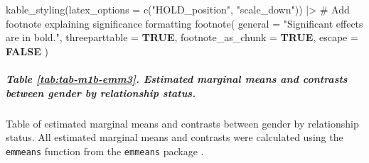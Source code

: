 \documentclass[
  bookmarksnumbered]{article}
\newenvironment{Shaded}{\begin{snugshade}}{\end{snugshade}}
\newcommand{\AttributeTok}[1]{\textcolor[rgb]{0.80,0.80,0.80}{#1}}
\newcommand{\CommentTok}[1]{\textcolor[rgb]{0.50,0.62,0.50}{#1}}
\newcommand{\ConstantTok}[1]{\textcolor[rgb]{0.86,0.64,0.64}{\textbf{#1}}}
\newcommand{\FunctionTok}[1]{\textcolor[rgb]{0.94,0.94,0.56}{#1}}
\newcommand{\NormalTok}[1]{\textcolor[rgb]{0.80,0.80,0.80}{#1}}
\newcommand{\SpecialCharTok}[1]{\textcolor[rgb]{0.86,0.64,0.64}{#1}}
\newcommand{\StringTok}[1]{\textcolor[rgb]{0.80,0.58,0.58}{#1}}
\begin{document}
\begin{Shaded}
\begin{Highlighting}[]
  \FunctionTok{kable\_styling}\NormalTok{(}\AttributeTok{latex\_options =} \FunctionTok{c}\NormalTok{(}\StringTok{"HOLD\_position"}\NormalTok{, }\StringTok{"scale\_down"}\NormalTok{)) }\SpecialCharTok{|\textgreater{}}
  \CommentTok{\# Add footnote explaining significance formatting}
  \FunctionTok{footnote}\NormalTok{(}
    \AttributeTok{general =} \StringTok{"Significant effects are in bold."}\NormalTok{, }\AttributeTok{threeparttable =} \ConstantTok{TRUE}\NormalTok{,}
    \AttributeTok{footnote\_as\_chunk =} \ConstantTok{TRUE}\NormalTok{, }\AttributeTok{escape =} \ConstantTok{FALSE}
\NormalTok{  )}
\end{Highlighting}
\end{Shaded}

\begin{table}[H]
\centering
\caption{\label{tab:tab-m1b-emm2}Estimated marginal means and contrasts between relationship status}
\centering
{}
\end{table}

\subparagraph{Table \ref{tab:tab-m1b-emm3}. Estimated marginal means and contrasts between gender by relationship status.}\label{table-reftabtab-m1b-emm3.-estimated-marginal-means-and-contrasts-between-gender-by-relationship-status.}

Table of estimated marginal means and contrasts between gender by relationship status. All estimated marginal means and contrasts were calculated using the \texttt{emmeans} function from the \texttt{emmeans} package \autocite{emmeanscit}.
\end{document}
